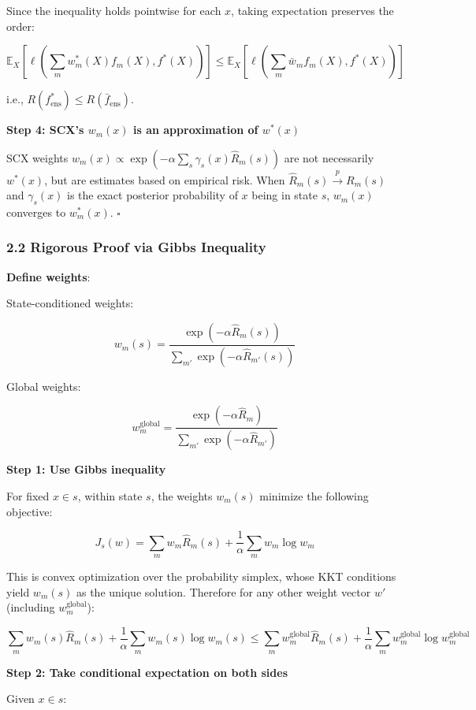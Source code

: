\documentclass[
  12pt,
]{article}
\begin{document}
Since the inequality holds pointwise for each \(x\), taking expectation preserves the order:

\[\mathbb{E}_X\left[\ell\left(\sum_m w_m^*(X) f_m(X), f^*(X)\right)\right] \leq \mathbb{E}_X\left[\ell\left(\sum_m \bar{w}_m f_m(X), f^*(X)\right)\right]\]

i.e., \(R(f_{\text{ens}}^*) \leq R(\bar{f}_{\text{ens}})\).

\textbf{Step 4: SCX's \(w_m(x)\) is an approximation of \(w^*(x)\)}

SCX weights
\(w_m(x) \propto \exp(-\alpha \sum_s \gamma_s(x) \hat{R}_m(s))\)
are not necessarily \(w^*(x)\), but are estimates based on empirical risk. When
\(\hat{R}_m(s) \xrightarrow{p} R_m(s)\) and \(\gamma_s(x)\) is the exact posterior probability of \(x\) being in state \(s\), \(w_m(x)\) converges to
\(w_m^*(x)\). \(\square\)

\subsubsection{2.2 Rigorous Proof via Gibbs Inequality}\label{rigorous-proof-gibbs}

\textbf{Define weights}:

State-conditioned weights:

\[w_m(s) = \frac{\exp(-\alpha \hat{R}_m(s))}{\sum_{m'} \exp(-\alpha \hat{R}_{m'}(s))}\]

Global weights:

\[w_m^{\text{global}} = \frac{\exp(-\alpha \hat{R}_m)}{\sum_{m'} \exp(-\alpha \hat{R}_{m'})}\]

\textbf{Step 1: Use Gibbs inequality}

For fixed \(x \in s\), within state \(s\), the weights \(w_m(s)\)
minimize the following objective:

\[J_s(w) = \sum_m w_m \hat{R}_m(s) + \frac{1}{\alpha} \sum_m w_m \log w_m\]

This is convex optimization over the probability simplex, whose KKT conditions yield \(w_m(s)\)
as the unique solution. Therefore for any other weight vector \(w'\) (including
\(w_m^{\text{global}}\)):

\[\sum_m w_m(s) \hat{R}_m(s) + \frac{1}{\alpha} \sum_m w_m(s) \log w_m(s) \leq \sum_m w_m^{\text{global}} \hat{R}_m(s) + \frac{1}{\alpha} \sum_m w_m^{\text{global}} \log w_m^{\text{global}}\]

\textbf{Step 2: Take conditional expectation on both sides}

Given \(x \in s\):
\end{document}
